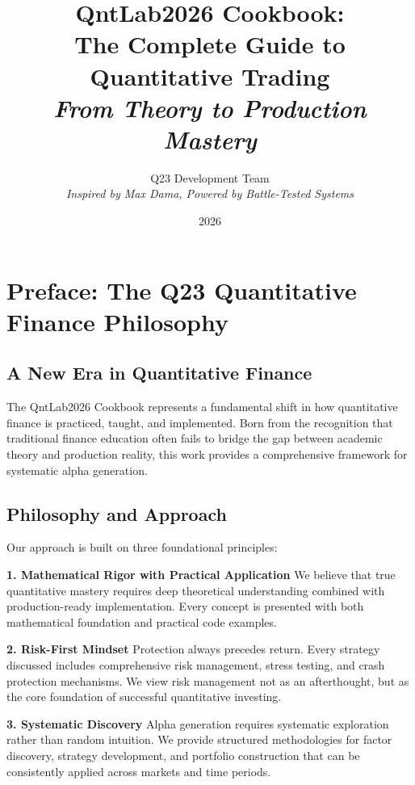 \documentclass[11pt,letterpaper,openany]{book}
\title{QntLab2026 Cookbook: \\
The Complete Guide to Quantitative Trading \\
\textit{From Theory to Production Mastery}}
\author{Q23 Development Team \\
\textit{Inspired by Max Dama, Powered by Battle-Tested Systems}}
\date{2026}
\begin{document}
\makeatletter
\@openrightfalse
\makeatother

\maketitle

\chapter*{Preface: The Q23 Quantitative Finance Philosophy}

\section*{A New Era in Quantitative Finance}

The QntLab2026 Cookbook represents a fundamental shift in how quantitative finance is practiced, taught, and implemented. Born from the recognition that traditional finance education often fails to bridge the gap between academic theory and production reality, this work provides a comprehensive framework for systematic alpha generation.

\section*{Philosophy and Approach}

Our approach is built on three foundational principles:

\textbf{1. Mathematical Rigor with Practical Application}
We believe that true quantitative mastery requires deep theoretical understanding combined with production-ready implementation. Every concept is presented with both mathematical foundation and practical code examples.

\textbf{2. Risk-First Mindset}
Protection always precedes return. Every strategy discussed includes comprehensive risk management, stress testing, and crash protection mechanisms. We view risk management not as an afterthought, but as the core foundation of successful quantitative investing.

\textbf{3. Systematic Discovery}
Alpha generation requires systematic exploration rather than random intuition. We provide structured methodologies for factor discovery, strategy development, and portfolio construction that can be consistently applied across markets and time periods.
\end{document}
